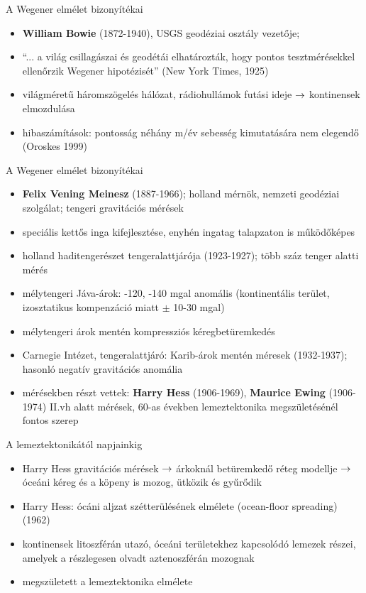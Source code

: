 \begin{frame}{A Wegener elmélet bizonyítékai}
    \begin{itemize}
        \item \textbf{William Bowie} (1872-1940), USGS geodéziai osztály vezetője;
        \item ``... a világ csillagászai és geodétái elhatározták, hogy pontos tesztmérésekkel ellenőrzik Wegener hipotézisét'' (New York Times, 1925)
        \item világméretű háromszögelés hálózat, rádiohullámok futási ideje $\rightarrow$ kontinensek elmozdulása
        \item hibaszámítások: pontosság néhány m/év sebesség kimutatására nem elegendő (Oroskes 1999)
    \end{itemize}
\end{frame}


\begin{frame}{A Wegener elmélet bizonyítékai}
    \begin{itemize}
        \item \textbf{Felix Vening Meinesz} (1887-1966); holland mérnök, nemzeti geodéziai szolgálat; tengeri gravitációs mérések
        \item speciális kettős inga kifejlesztése, enyhén ingatag talapzaton is működőképes
        \item holland haditengerészet tengeralattjárója (1923-1927); több száz tenger alatti mérés
        \item mélytengeri Jáva-árok: -120, -140 mgal anomális (kontinentális terület, izosztatikus kompenzáció miatt $\pm$ 10-30 mgal)
        \item mélytengeri árok mentén kompressziós kéregbetüremkedés
        \item Carnegie Intézet, tengeralattjáró: Karib-árok mentén méresek (1932-1937); hasonló negatív gravitációs anomália
        \item mérésekben részt vettek: \textbf{Harry Hess} (1906-1969), \textbf{Maurice Ewing} (1906-1974) II.vh alatt mérések, 60-as években lemeztektonika megszületésénél fontos szerep
    \end{itemize}
\end{frame}


\begin{frame}{A lemeztektonikától napjainkig}
    \begin{itemize}
        \item Harry Hess gravitációs mérések $\rightarrow$ árkoknál betüremkedő réteg modellje $\rightarrow$ óceáni kéreg és a köpeny is mozog, ütközik és gyűrődik
        \item Harry Hess: ócáni aljzat szétterülésének elmélete (ocean-floor spreading) (1962)
        \item kontinensek litoszférán utazó, óceáni területekhez kapcsolódó lemezek részei, amelyek a részlegesen olvadt aztenoszférán mozognak
        \item megszületett a lemeztektonika elmélete
    \end{itemize}
\end{frame}


